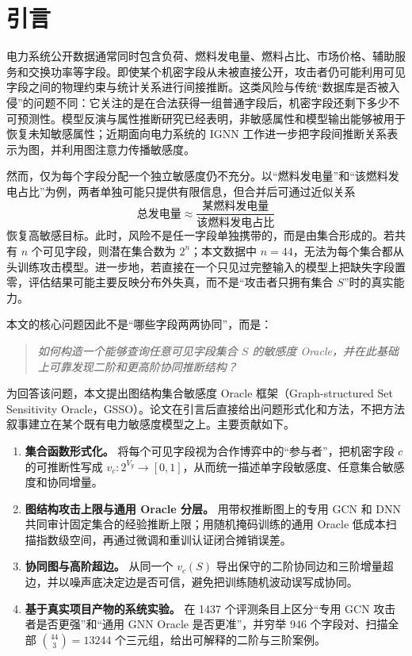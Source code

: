 \documentclass[UTF8,a4paper,zihao=5,fontset=fandol]{ctexart}
\newcommand{\method}{GSSO}
\begin{document}
\pagestyle{fancy}

\section{引言}

电力系统公开数据通常同时包含负荷、燃料发电量、燃料占比、市场价格、辅助服务和交换功率等字段。即使某个机密字段从未被直接公开，攻击者仍可能利用可见字段之间的物理约束与统计关系进行间接推断。这类风险与传统“数据库是否被入侵”的问题不同：它关注的是在合法获得一组普通字段后，机密字段还剩下多少不可预测性。模型反演与属性推断研究已经表明，非敏感属性和模型输出能够被用于恢复未知敏感属性\citep{fredrikson2015model,mehnaz2022sensitive}；近期面向电力系统的 IGNN 工作进一步把字段间推断关系表示为图，并利用图注意力传播敏感度\citep{hu2026ignn}。

然而，仅为每个字段分配一个独立敏感度仍不充分。以“燃料发电量”和“该燃料发电占比”为例，两者单独可能只提供有限信息，但合并后可通过近似关系
\begin{equation}
  \text{总发电量}\approx
  \frac{\text{某燃料发电量}}{\text{该燃料发电占比}}
\end{equation}
恢复高敏感目标。此时，风险不是任一字段单独携带的，而是由集合形成的。若共有 $n$ 个可见字段，则潜在集合数为 $2^n$；本文数据中 $n=44$，无法为每个集合都从头训练攻击模型。进一步地，若直接在一个只见过完整输入的模型上把缺失字段置零，评估结果可能主要反映分布外失真，而不是“攻击者只拥有集合 $S$”时的真实能力。

本文的核心问题因此不是“哪些字段两两协同”，而是：
\begin{quote}
\centering
\emph{如何构造一个能够查询任意可见字段集合 $S$ 的敏感度 Oracle，并在此基础上可靠发现二阶和更高阶协同推断结构？}
\end{quote}

为回答该问题，本文提出图结构集合敏感度 Oracle 框架（Graph-structured Set Sensitivity Oracle，\method）。论文在引言后直接给出问题形式化和方法，不把方法叙事建立在某个既有电力敏感度模型之上。主要贡献如下。

\begin{enumerate}
  \item \textbf{集合函数形式化。} 将每个可见字段视为合作博弈中的“参与者”，把机密字段 $c$ 的可推断性写成 $v_c:2^{V_g}\rightarrow[0,1]$，从而统一描述单字段敏感度、任意集合敏感度和协同增量。
  \item \textbf{图结构攻击上限与通用 Oracle 分层。} 用带权推断图上的专用 GCN 和 DNN 共同审计固定集合的经验推断上限；用随机掩码训练的通用 Oracle 低成本扫描指数级空间，再通过微调和重训认证闭合摊销误差。
  \item \textbf{协同图与高阶超边。} 从同一个 $v_c(S)$ 导出保守的二阶协同边和三阶增量超边，并以噪声底决定边是否可信，避免把训练随机波动误写成协同。
  \item \textbf{基于真实项目产物的系统实验。} 在 1437 个评测条目上区分“专用 GCN 攻击者是否更强”和“通用 GNN Oracle 是否更准”，并穷举 946 个字段对、扫描全部 $\binom{44}{3}=13244$ 个三元组，给出可解释的二阶与三阶案例。
\end{enumerate}
\end{document}

